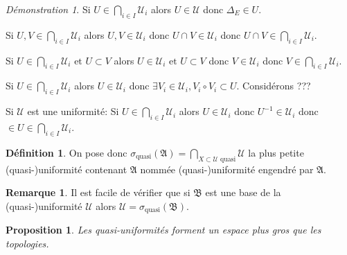 \documentclass[a4paper, 11pt, french]{book}
\newenvironment{itemise}{\itemize}{\enditemize}
\theoremstyle{plain} %
\newtheorem{proposition}{Proposition}
\theoremstyle{definition} %
\newtheorem{definition}{Définition}
\newtheorem{remarque}{Remarque}
\theoremstyle{remark} %
\newtheorem*{demonstration}{Démonstration}
\newcommand{\1}{\mathds{1}}
\newcommand{\inv}[1]{#1^{-1}}
\newcommand\et{\text{ et }}
\begin{document}
\begin{demonstration}
	\begin{itemise}
		\item Si $U\in\bigcap_{i\in I}\mathscr{U}_i$ alors $U\in\mathscr{U}$ donc $\Delta_E\in U$.
		\item Si $U, V\in\bigcap_{i\in I}\mathscr{U}_i$ alors $U, V\in\mathscr{U}_i$ donc $U\cap V\in\mathscr{U}_i$ donc $U\cap V\in\bigcap_{i\in I}\mathscr{U}_i$.
		\item Si $U\in\bigcap_{i\in I}\mathscr{U}_i\et U\subset V$ alors $U\in\mathscr{U}_i\et U\subset V$ donc $V\in\mathscr{U}_i$ donc $V\in\bigcap_{i\in I}\mathscr{U}_i$.
		\item Si $U\in\bigcap_{i\in I}\mathscr{U}_i$ alors $U\in\mathscr{U}_i$ donc $\exists V_i\in\mathscr{U}_i, V_i\circ V_i\subset U$.
		Considérons {\color{red} ???}
		\item Si $\mathscr{U}$ est une uniformité: Si $U\in\bigcap_{i\in I}\mathscr{U}_i$ alors $U\in\mathscr{U}_i$ donc $\inv{U}\in\mathscr{U}_i$ donc $\in{U}\in\bigcap_{i\in I}\mathscr{U}_i$.
	\end{itemise}
\end{demonstration}

\begin{definition}
	On pose donc $\sigma_\text{quasi}(\mathfrak{A})=\bigcap_{X\subset\mathscr{U}\text{ quasi}}\mathscr{U}$ la plus petite (quasi-)uniformité contenant $\mathfrak{A}$ nommée (quasi-)uniformité engendré par $\mathfrak{A}$.
\end{definition}

\begin{remarque}
	Il est facile de vérifier que si $\mathfrak{B}$ est une base de la (quasi-)uniformité $\mathscr{U}$ alors $\mathscr{U}=\sigma_\text{quasi}(\mathfrak{B})$.
\end{remarque}

\begin{proposition}
	Les quasi-uniformités forment un espace plus gros que les topologies.
\end{proposition}
\end{document}

